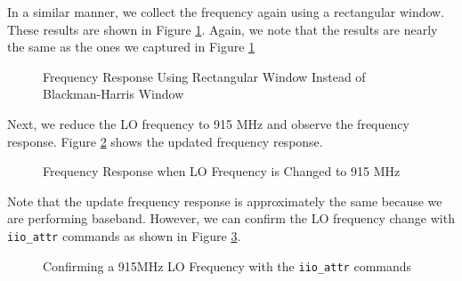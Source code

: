\documentclass{article}
\begin{document}
In a similar manner, we collect the frequency again using a rectangular window. These results are shown in Figure \ref{fig::gnu_radio_loopback_generic_iio_rect_win}. Again, we note that the results are nearly the same as the ones we captured in Figure \ref{fig::gnu_radio_loopback_generic_iio_rect_win}

\begin{figure}[H]
	\centerline{}
	\caption{Frequency Response Using Rectangular Window Instead of Blackman-Harris Window}
	\label{fig::gnu_radio_loopback_generic_iio_rect_win}
\end{figure}

Next, we reduce the LO frequency to 915 MHz and observe the frequency response. 
Figure \ref{fig::gnu_radio_loopback_generic_iio_915_MHz_lo} shows the updated frequency response.

\begin{figure}[H]
	\centerline{}
	\caption{Frequency Response when LO Frequency is Changed to 915 MHz}
	\label{fig::gnu_radio_loopback_generic_iio_915_MHz_lo}
\end{figure}

Note that the update frequency response is approximately the same because we are performing baseband. However, we can confirm the LO frequency change with \texttt{iio\_attr} commands as shown in Figure \ref{fig::iio_attr_confirm_lo_frequency}.

\begin{figure}[H]
	\centerline{}
	\caption{Confirming a 915MHz LO Frequency with the \texttt{iio\_attr} commands}
	\label{fig::iio_attr_confirm_lo_frequency}
\end{figure}
\end{document}
